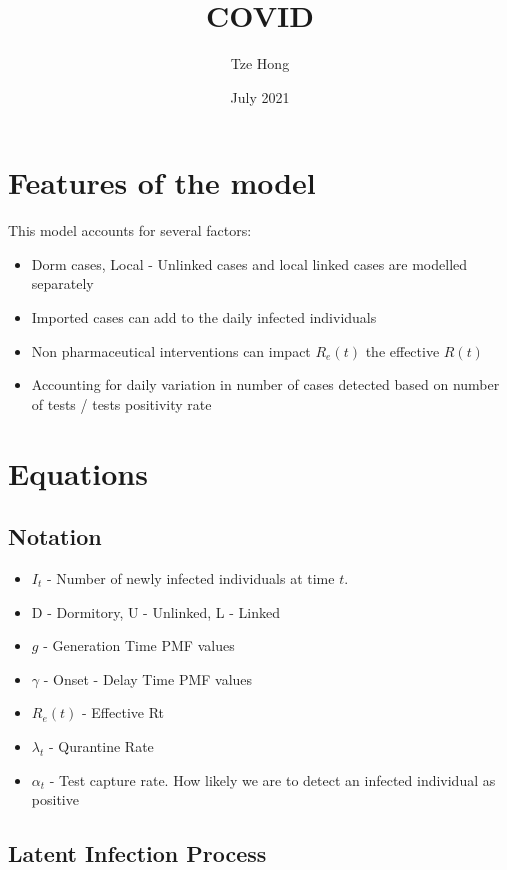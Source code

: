 \documentclass{article}
\title{COVID}
\author{Tze Hong}
\date{July 2021}
\begin{document}
\maketitle

\section{Features of the model}

This model accounts for several factors:
\begin{itemize}
  \item Dorm cases, Local - Unlinked cases and local linked cases are modelled separately
  \item Imported cases can add to the daily infected individuals
  \item Non pharmaceutical interventions can impact $R_e(t)$ the effective $R(t)$
  \item Accounting for daily variation in number of cases detected based on number of tests / tests positivity rate
\end{itemize}

\section{Equations}

\subsection{Notation}
\begin{itemize}
  \item $I_t$ - Number of newly infected individuals at time $t$. 
  \item D - Dormitory, U - Unlinked, L - Linked
  \item $g$ - Generation Time PMF values
  \item $\gamma$ - Onset - Delay Time PMF values
  \item $R_e(t)$ - Effective Rt
  \item $\lambda_t$ - Qurantine Rate
  \item $\alpha_t$ - Test capture rate. How likely we are to detect an infected individual as positive

\end{itemize}
\subsection{Latent Infection Process}
\end{document}
